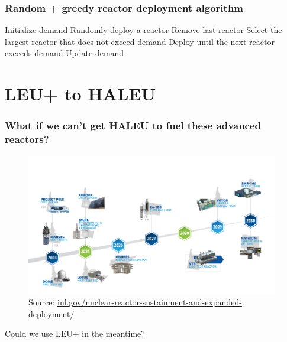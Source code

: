 \documentclass[9pt]{beamer}
\begin{document}
  \begin{frame}
    \frametitle{Random + greedy reactor deployment algorithm}
        \begin{algorithmic}[1]
            \State Initialize demand
                \State Randomly deploy a reactor
                    \State Remove last reactor
                        \State Select the largest reactor that does not exceed demand
                        \State Deploy until the next reactor exceeds demand
                        \State Update demand
                    \EndIf
                \EndIf
            \EndWhile
        \end{algorithmic}
  \end{frame}

  \section{LEU+ to HALEU}
  \begin{frame}
    \frametitle{What if we can't get HALEU to fuel these advanced reactors?}
    \vspace{-25pt}
    \begin{figure}
        \centering
        \includegraphics[width=0.98\textwidth]{../images/reactor_timeline.png}
        \caption{Source: \url{inl.gov/nuclear-reactor-sustainment-and-expanded-deployment/}}
    \end{figure}
    \vspace{-8pt}
    Could we use LEU+ in the meantime?
  \end{frame}
\end{document}
